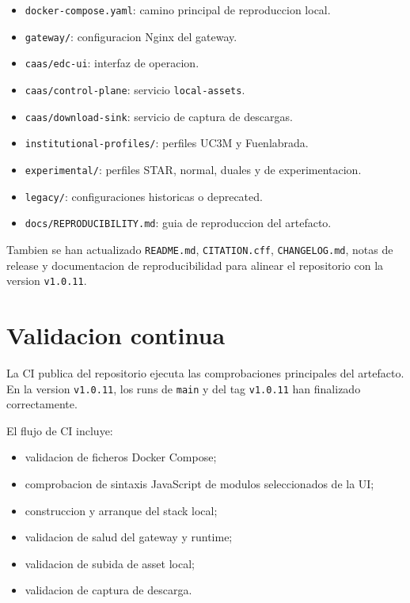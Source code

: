 \documentclass{article}
\begin{document}
\begin{itemize}[leftmargin=1.2cm]
    \item \texttt{docker-compose.yaml}: camino principal de reproduccion local.
    \item \texttt{gateway/}: configuracion Nginx del gateway.
    \item \texttt{caas/edc-ui}: interfaz de operacion.
    \item \texttt{caas/control-plane}: servicio \texttt{local-assets}.
    \item \texttt{caas/download-sink}: servicio de captura de descargas.
    \item \texttt{institutional-profiles/}: perfiles UC3M y Fuenlabrada.
    \item \texttt{experimental/}: perfiles STAR, normal, duales y de experimentacion.
    \item \texttt{legacy/}: configuraciones historicas o deprecated.
    \item \texttt{docs/REPRODUCIBILITY.md}: guia de reproduccion del artefacto.
\end{itemize}

Tambien se han actualizado \texttt{README.md}, \texttt{CITATION.cff}, \texttt{CHANGELOG.md}, notas de release y documentacion de reproducibilidad para alinear el repositorio con la version \texttt{v1.0.11}.

\section{Validacion continua}

La CI publica del repositorio ejecuta las comprobaciones principales del artefacto. En la version \texttt{v1.0.11}, los runs de \texttt{main} y del tag \texttt{v1.0.11} han finalizado correctamente.

El flujo de CI incluye:

\begin{itemize}[leftmargin=1.2cm]
    \item validacion de ficheros Docker Compose;
    \item comprobacion de sintaxis JavaScript de modulos seleccionados de la UI;
    \item construccion y arranque del stack local;
    \item validacion de salud del gateway y runtime;
    \item validacion de subida de asset local;
    \item validacion de captura de descarga.
\end{itemize}
\end{document}
